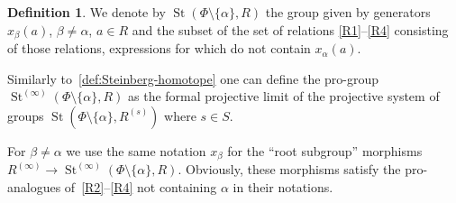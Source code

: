\documentclass[oneside, 11pt]{amsart}
\numberwithin{equation}{section}
\theoremstyle{definition}
\newtheorem{df}[lemma]{Definition} \Crefname{df}{Definition}{Definitions}
\theoremstyle{remark}
\DeclareMathOperator\St{St}
\begin{document}
\begin{df}
We denote by $\St(\Phi\setminus\{\alpha\}, R)$ the group given by generators $x_\beta(a)$, $\beta \neq \alpha$, $a\in R$ and the subset of the set of relations \eqref{R1}--\eqref{R4} consisting of those relations, expressions for which do not contain $x_{\alpha}(a)$. %

Similarly to~\cref{def:Steinberg-homotope} one can define the pro-group $\St^{(\infty)}(\Phi \setminus\{ \alpha\}, R)$ as
the formal projective limit of the projective system of groups $\St(\Phi\setminus\{ \alpha\}, R^{(s)})$ where $s\in S$.
\end{df}

For $\beta \neq \alpha$ we use the same notation $x_\beta$ for the ``root subgroup'' morphisms 
$R^{(\infty)}\to \St^{(\infty)}(\Phi \setminus\{\alpha\}, R).$
Obviously, these morphisms satisfy the pro-analogues of~\eqref{R2}--\eqref{R4} not containing $\alpha$ in their notations.
\end{document}
